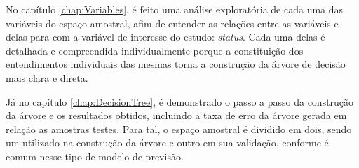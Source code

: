 No capítulo \ref{chap:Variables}, é feito uma análise exploratória de cada uma das variáveis do espaço amostral, afim de entender as relações entre as variáveis e delas para com a variável de interesse do estudo: \emph{status}. Cada uma delas é detalhada e compreendida individualmente porque a constituição dos entendimentos individuais das mesmas torna a construção da árvore de decisão mais clara e direta.

Já no capítulo \ref{chap:DecisionTree}, é demonstrado o passo a passo da construção da árvore e os resultados obtidos, incluindo a taxa de erro da árvore gerada em relação as amostras testes. Para tal, o espaço amostral é dividido em dois, sendo um utilizado na construção da árvore e outro em sua validação, conforme é comum nesse tipo de modelo de previsão.
